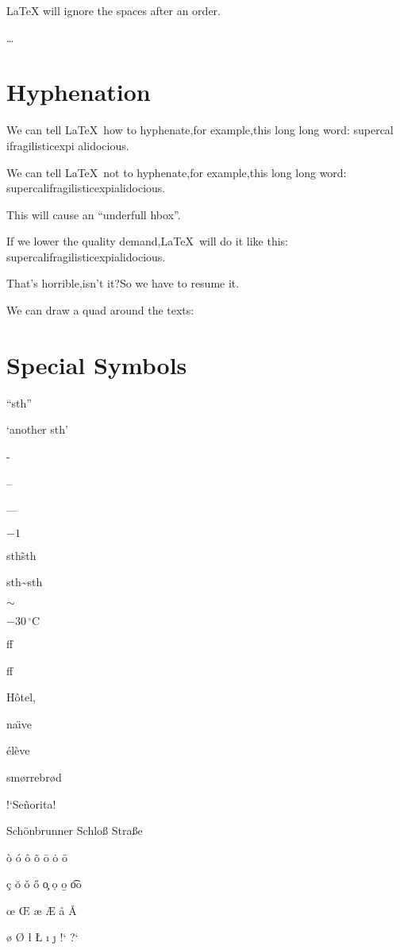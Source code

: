 \documentclass[a4paper]{report}
\begin{document}
\LaTeX{} will ignore the spaces after an order.

\ldots

\section{Hyphenation}

We can tell \LaTeX\ how to hyphenate,for example,this long long word: su\-per\-cal\-%
i\-frag\-i\-lis\-tic\-ex\-pi\-%
al\-i\-do\-cious.

We can tell \LaTeX\ not to hyphenate,for example,this long long
word: \mbox{supercalifragilisticexpialidocious}.

This will cause an ``underfull hbox''.

If we lower the quality demand,\LaTeX\ will do it like this:\sloppy
\mbox{supercalifragilisticexpialidocious}.

That's horrible,isn't it?So we have to resume it.\fussy

We can draw a quad around the
texts:

\section{Special Symbols}

``sth''

`another sth'

-

--

---

$-1$

sth\~ sth

sth\~{}sth

$\sim$

$-30\,^{\circ}\mathrm{C}$

ff

f\mbox{}f

H\^otel,

na\"\i ve

\'el\`eve

sm\o rrebr\o d

!`Se\~norita!

Sch\"onbrunner Schlo\ss{} Stra\ss e

\`o{} \'o{} \^o{} \~o{}  \=o{}  \.o{} \"o{}


\c c \u o \v o \H o \c o  \d o \b o \t oo

\oe{} \OE{} \ae{} \AE{} \aa{} \AA{}

 \o{} \O{} \l{} \L{} \i{} \j{}
!`{} ?`
\end{document}
